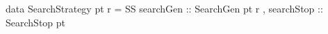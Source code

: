 data SearchStrategy pt r =
  SS { searchGen  :: SearchGen pt r
     , searchStop :: SearchStop pt }
